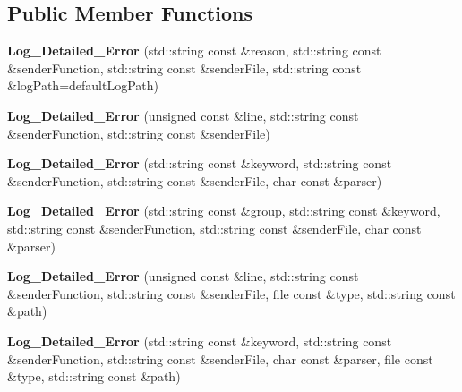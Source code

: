 \subsection*{Public Member Functions}
\begin{DoxyCompactItemize}
\item 
\hypertarget{classstb_1_1Log__Detailed__Error_a1acb8e733394100503ef4263e646f784}{{\bfseries Log\+\_\+\+Detailed\+\_\+\+Error} (std\+::string const \&reason, std\+::string const \&sender\+Function, std\+::string const \&sender\+File, std\+::string const \&log\+Path=default\+Log\+Path)}\label{classstb_1_1Log__Detailed__Error_a1acb8e733394100503ef4263e646f784}

\item 
\hypertarget{classstb_1_1Log__Detailed__Error_a5b3a70b4654fc29808b6116bb867d0ba}{{\bfseries Log\+\_\+\+Detailed\+\_\+\+Error} (unsigned const \&line, std\+::string const \&sender\+Function, std\+::string const \&sender\+File)}\label{classstb_1_1Log__Detailed__Error_a5b3a70b4654fc29808b6116bb867d0ba}

\item 
\hypertarget{classstb_1_1Log__Detailed__Error_a17ae4733eaf94aa7b1400cddc77f04eb}{{\bfseries Log\+\_\+\+Detailed\+\_\+\+Error} (std\+::string const \&keyword, std\+::string const \&sender\+Function, std\+::string const \&sender\+File, char const \&parser)}\label{classstb_1_1Log__Detailed__Error_a17ae4733eaf94aa7b1400cddc77f04eb}

\item 
\hypertarget{classstb_1_1Log__Detailed__Error_abd0df2bd02ef583d6d4bf08680361944}{{\bfseries Log\+\_\+\+Detailed\+\_\+\+Error} (std\+::string const \&group, std\+::string const \&keyword, std\+::string const \&sender\+Function, std\+::string const \&sender\+File, char const \&parser)}\label{classstb_1_1Log__Detailed__Error_abd0df2bd02ef583d6d4bf08680361944}

\item 
\hypertarget{classstb_1_1Log__Detailed__Error_ad11dfdd332ed935aebca671e2285b873}{{\bfseries Log\+\_\+\+Detailed\+\_\+\+Error} (unsigned const \&line, std\+::string const \&sender\+Function, std\+::string const \&sender\+File, file const \&type, std\+::string const \&path)}\label{classstb_1_1Log__Detailed__Error_ad11dfdd332ed935aebca671e2285b873}

\item 
\hypertarget{classstb_1_1Log__Detailed__Error_a766d3c00e95834b019e1c2e1ba19963d}{{\bfseries Log\+\_\+\+Detailed\+\_\+\+Error} (std\+::string const \&keyword, std\+::string const \&sender\+Function, std\+::string const \&sender\+File, char const \&parser, file const \&type, std\+::string const \&path)}\label{classstb_1_1Log__Detailed__Error_a766d3c00e95834b019e1c2e1ba19963d}


\end{DoxyCompactItemize}
